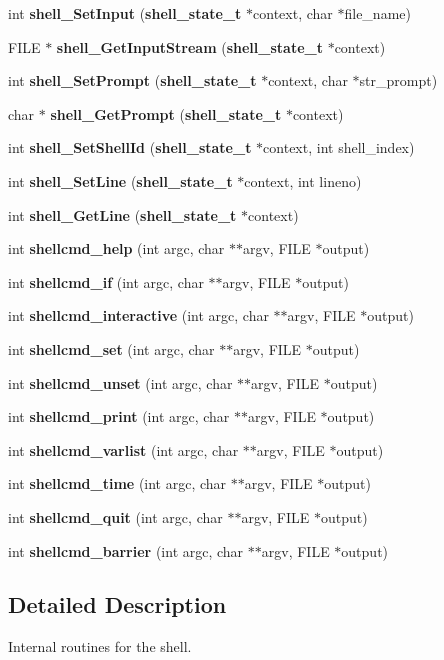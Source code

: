 \begin{CompactItemize}
int {\bf shell\_\-Set\-Input} ({\bf shell\_\-state\_\-t} $\ast$context, char $\ast$file\_\-name)
\item 
FILE $\ast$ {\bf shell\_\-Get\-Input\-Stream} ({\bf shell\_\-state\_\-t} $\ast$context)
\item 
int {\bf shell\_\-Set\-Prompt} ({\bf shell\_\-state\_\-t} $\ast$context, char $\ast$str\_\-prompt)
\item 
char $\ast$ {\bf shell\_\-Get\-Prompt} ({\bf shell\_\-state\_\-t} $\ast$context)
\item 
int {\bf shell\_\-Set\-Shell\-Id} ({\bf shell\_\-state\_\-t} $\ast$context, int shell\_\-index)
\item 
int {\bf shell\_\-Set\-Line} ({\bf shell\_\-state\_\-t} $\ast$context, int lineno)
\item 
int {\bf shell\_\-Get\-Line} ({\bf shell\_\-state\_\-t} $\ast$context)
\item 
int {\bf shellcmd\_\-help} (int argc, char $\ast$$\ast$argv, FILE $\ast$output)
\item 
int {\bf shellcmd\_\-if} (int argc, char $\ast$$\ast$argv, FILE $\ast$output)
\item 
int {\bf shellcmd\_\-interactive} (int argc, char $\ast$$\ast$argv, FILE $\ast$output)
\item 
int {\bf shellcmd\_\-set} (int argc, char $\ast$$\ast$argv, FILE $\ast$output)
\item 
int {\bf shellcmd\_\-unset} (int argc, char $\ast$$\ast$argv, FILE $\ast$output)
\item 
int {\bf shellcmd\_\-print} (int argc, char $\ast$$\ast$argv, FILE $\ast$output)
\item 
int {\bf shellcmd\_\-varlist} (int argc, char $\ast$$\ast$argv, FILE $\ast$output)
\item 
int {\bf shellcmd\_\-time} (int argc, char $\ast$$\ast$argv, FILE $\ast$output)
\item 
int {\bf shellcmd\_\-quit} (int argc, char $\ast$$\ast$argv, FILE $\ast$output)
\item 
int {\bf shellcmd\_\-barrier} (int argc, char $\ast$$\ast$argv, FILE $\ast$output)
\end{CompactItemize}


\subsection{Detailed Description}
Internal routines for the shell. 

